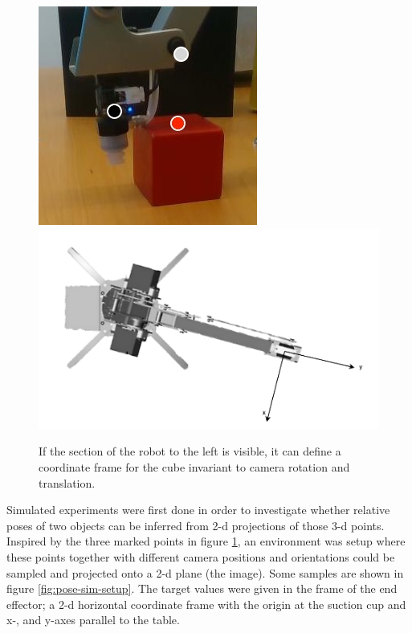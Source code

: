 \begin{figure}[h!]
    \centering
    \includegraphics[width=0.32 \textwidth]{res/pose-feature-points.jpg}
    \includegraphics[width=0.5 \textwidth]{res/end-effector-frame.pdf}

    \caption{If the section of the robot to the left is visible, it can define
    a coordinate frame for the cube invariant to camera rotation and
    translation.}

    \label{fig:end-effector-frame}
    
\end{figure}

Simulated experiments were first done in order to investigate whether relative
poses of two objects can be inferred from 2-d projections of those 3-d points.
Inspired by the three marked points in figure \ref{fig:end-effector-frame}, an
environment was setup where these points together with different camera
positions and orientations could be sampled and projected onto a 2-d plane (the
image). Some samples are shown in figure \ref{fig:pose-sim-setup}. The target
values were given in the frame of the end effector; a 2-d horizontal coordinate
frame with the origin at the suction cup and x-, and y-axes parallel to the
table.

